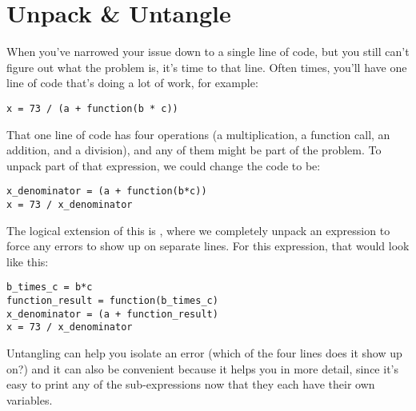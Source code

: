 \documentclass{handout}
\begin{document}
\section{Unpack \& Untangle}

When you've narrowed your issue down to a single line of code, but you still can't figure out what the problem is, it's time to  that line. Often times, you'll have one line of code that's doing a lot of work, for example:

\begin{lstlisting}
x = 73 / (a + function(b * c))
\end{lstlisting}

That one line of code has four operations (a multiplication, a function call, an addition, and a division), and any of them might be part of the problem. To unpack part of that expression, we could change the code to be:

\begin{lstlisting}
x_denominator = (a + function(b*c))
x = 73 / x_denominator
\end{lstlisting}

The logical extension of this is , where we completely unpack an expression to force any errors to show up on separate lines. For this expression, that would look like this:

\begin{lstlisting}
b_times_c = b*c
function_result = function(b_times_c)
x_denominator = (a + function_result)
x = 73 / x_denominator
\end{lstlisting}

Untangling can help you isolate an error (which of the four lines does it show up on?) and it can also be convenient because it helps you  in more detail, since it's easy to print any of the sub-expressions now that they each have their own variables.
\end{document}

